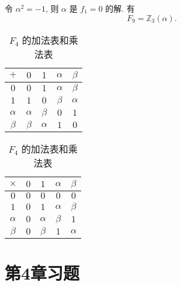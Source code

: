 \documentclass{ctexart}
\begin{document}
\begin{example}
    令 $\alpha^2=-1$, 则 $\alpha$ 是 $f_1=0$ 的解. 有
    \[F_9=\mathbb{Z}_3(\alpha).\]
    \begin{table}\caption{$F_4$ 的加法表和乘法表}\label{tb1}
        \begin{center}
            \begin{tabular}{c|cccc}
                $+$      & $0$      & $1$      & $\alpha$ & $\beta$   \\
                \hline
                $0$      & $0$      & $1$      & $\alpha$ & $\beta$   \\
                $1$      & $1$      & $0$      & $\beta$  & $\alpha$  \\
                $\alpha$ & $\alpha$ & $\beta$  & $0$      & $1$       \\
                $\beta$  & $\beta$  & $\alpha$ & $1$      & $0$       \\
            \end{tabular}\quad\quad
            \begin{tabular}{c|cccc}
                $\times$ & $0$ & $1$      & $\alpha$ & $\beta$  \\
                \hline
                $0$      & $0$ & $0$      & $0$      & $0$      \\
                $1$      & $0$ & $1$      & $\alpha$ & $\beta$  \\
                $\alpha$ & $0$ & $\alpha$ & $\beta$  & $1$      \\
                $\beta$  & $0$ & $\beta$  & $1$      & $\alpha$ \\
            \end{tabular}
        \end{center}
    \end{table}
\end{example}
\section{第4章习题}
\end{document}
